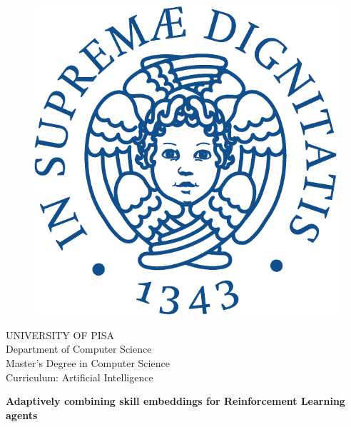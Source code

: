 \begin{titlepage}
\begin{figure}[!htb]
    \centering
    \includegraphics[keepaspectratio=true,scale=0.5]{images/Frontespizio/cherubinFrontespizio-eps-converted-to}
\end{figure}

\begin{center}
    \LARGE{UNIVERSITY OF PISA}
    \vspace{5mm}
    \\ \large{Department of Computer Science}
    \vspace{5mm}
    \\ \LARGE{Master's Degree in Computer Science}
    \\ \LARGE{Curriculum: Artificial Intelligence}
\end{center}


\vspace{7mm}
\begin{center}
    {\LARGE{\bf Adaptively combining skill embeddings for Reinforcement Learning agents \\ \vspace{5mm}
    }}
    

\end{center}
\end{titlepage}
